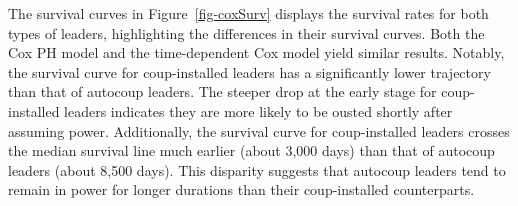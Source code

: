 \documentclass[
  12pt,
]{article}
\begin{document}
The survival curves in Figure~\ref{fig-coxSurv} displays the survival
rates for both types of leaders, highlighting the differences in their
survival curves. Both the Cox PH model and the time-dependent Cox model
yield similar results. Notably, the survival curve for coup-installed
leaders has a significantly lower trajectory than that of autocoup
leaders. The steeper drop at the early stage for coup-installed leaders
indicates they are more likely to be ousted shortly after assuming
power. Additionally, the survival curve for coup-installed leaders
crosses the median survival line much earlier (about 3,000 days) than
that of autocoup leaders (about 8,500 days). This disparity suggests
that autocoup leaders tend to remain in power for longer durations than
their coup-installed counterparts.

\begin{figure}

\begin{minipage}{0.50\linewidth}



\end{minipage}%
%
\begin{minipage}{0.50\linewidth}

\end{minipage}
\end{figure}
\end{document}
